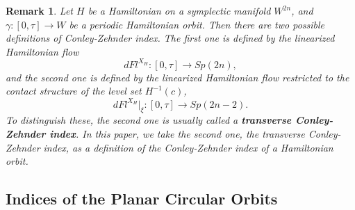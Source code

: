 \documentclass{amsart}
\newcommand{\g}{\gamma}
\newtheorem{remark}[thm]{Remark}
\begin{document}
\begin{remark}\rm
	Let $H$ be a Hamiltonian on a symplectic manifold $W^{2n}$, and $\g:[0,\tau]\to W$ be a periodic Hamiltonian orbit.
	Then there are two possible definitions of Conley-Zehnder index.
	The first one is defined by the linearized Hamiltonian flow
		$$dFl^{X_H}:[0,\tau]\to Sp(2n),$$
	and the second one is defined by the linearized Hamiltonian flow restricted to the contact structure of the level set $H^{-1}(c)$,
		$$
		dFl^{X_H}|_{\xi}:[0,\tau]\to Sp(2n-2).
		$$
	To distinguish these, the second one is usually called a \textbf{transverse Conley-Zehnder index}.
	In this paper, we take the second one, the transverse Conley-Zehnder index, as a definition of the Conley-Zehnder index of a Hamiltonian orbit.
\end{remark}

\subsection{Indices of the Planar Circular Orbits}\label{Subsection - Planar Index}
\end{document}
